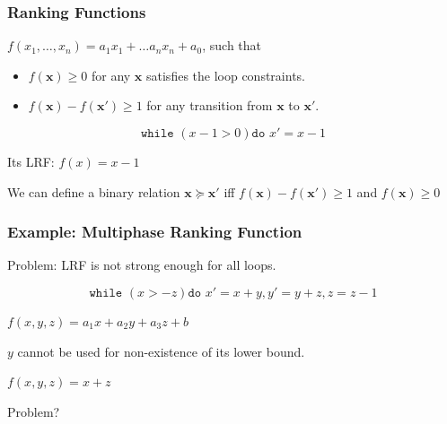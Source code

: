 \documentclass[11pt]{beamer}
\begin{document}
\begin{frame}\frametitle{Ranking Functions}

\begin{definition}

$f(x_1, \ldots, x_n) = a_1x_1 + \ldots a_nx_n + a_0$, such that

\begin{itemize}
\item $f(\textbf{x}) \ge 0$ for any $\textbf{x}$ satisfies the loop constraints.

\item $f(\textbf{x}) - f(\textbf{x}') \ge 1$ for any transition from $\textbf{x}$ to $\textbf{x}'$.



\end{itemize}
\end{definition}

\begin{example}
\[\texttt{while }( x - 1 > 0) \texttt{do } x' = x - 1\]

Its LRF: $f(x) = x - 1$
\end{example}

We can define a binary relation $\textbf{x} \succeq \textbf{x}'$ iff  $f(\textbf{x}) - f(\textbf{x}') \ge 1$ and $f(\textbf{x}) \ge 0$

\end{frame}


\begin{frame}\frametitle{Example: Multiphase Ranking Function}
Problem: LRF is not strong enough for all loops.
\begin{example}
\[\texttt{while }( x > -z) \texttt{do } x' = x + y, y' = y + z, z = z - 1\]

$f(x, y, z) = a_1x + a_2y + a_3z + b$

$y$ cannot be used for non-existence of its lower bound.

$f(x, y, z) = x + z$

Problem?
\end{example}

\end{frame}
\end{document}
